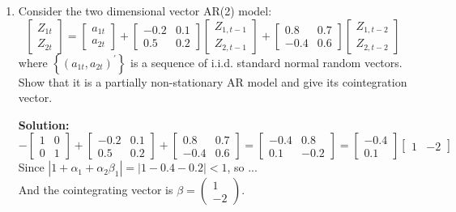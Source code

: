 \documentclass{article}
\begin{document}
\begin{enumerate}
	\item Consider the two dimensional vector AR(2) model:
	\begin{equation*}
	\left[ \begin{array}{c}{Z_{1 t}} \\ {Z_{2 t}}\end{array}\right]=\left[ \begin{array}{c}{a_{1 t}} \\ {a_{2 t}}\end{array}\right]+\left[ \begin{array}{cc}{-0.2} & {0.1} \\ {0.5} & {0.2}\end{array}\right] \left[ \begin{array}{c}{Z_{1, t-1}} \\ {Z_{2, t-1}}\end{array}\right]+\left[ \begin{array}{cc}{0.8} & {0.7} \\ {-0.4} & {0.6}\end{array}\right] \left[ \begin{array}{c}{Z_{1, t-2}} \\ {Z_{2, t-2}}\end{array}\right]
	\end{equation*}
	where $\left\{\left(a_{1 t}, a_{2 t}\right)^{\prime}\right\}$ is a sequence of i.i.d. standard normal random vectors.
	Show that it is a partially non-stationary AR model and give its cointegration vector.
	
	\textbf{Solution:}
	\begin{equation*}
	-\left[ \begin{array}{ll}{1} & {0} \\ {0} & {1}\end{array}\right]+\left[ \begin{array}{cc}{-0.2} & {0.1} \\ {0.5} & {0.2}\end{array}\right]+\left[ \begin{array}{cc}{0.8} & {0.7} \\ {-0.4} & {0.6}\end{array}\right]=\left[ \begin{array}{cc}{-0.4} & {0.8} \\ {0.1} & {-0.2}\end{array}\right]=\left[ \begin{array}{c}{-0.4} \\ {0.1}\end{array}\right] \left[ \begin{array}{ll}{1} & {-2}\end{array}\right]
	\end{equation*}
	Since $|1+\alpha_1+\alpha_2\beta_1| = |1-0.4-0.2| < 1$, so ...\\
	And the cointegrating vector is $\beta=\left( \begin{array}{c}{1} \\ {-2}\end{array}\right)$.
	

\end{enumerate}
\end{document}
